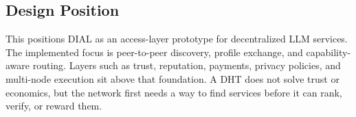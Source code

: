 \subsection{Design Position}

This positions DIAL as an access-layer prototype for decentralized LLM
services. The implemented focus is peer-to-peer discovery, profile exchange,
and capability-aware routing. Layers such as trust,
reputation, payments, privacy policies, and multi-node execution sit above that
foundation. A DHT does not solve trust or economics, but the network first
needs a way to find services before it can rank, verify, or reward them.
